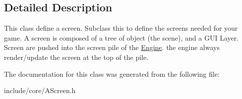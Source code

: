 \subsection{\-Detailed \-Description}
\-This class define a screen. \-Subclass this to define the screens needed for your game. \-A screen is composed of a tree of object (the scene), and a \-G\-U\-I \-Layer. \-Screen are pushed into the screen pile of the \hyperlink{classde_1_1_engine}{\-Engine}. the engine always render/update the screen at the top of the pile. 

\-The documentation for this class was generated from the following file\-:\begin{DoxyCompactItemize}
\item 
include/core/\-A\-Screen.\-h\end{DoxyCompactItemize}
